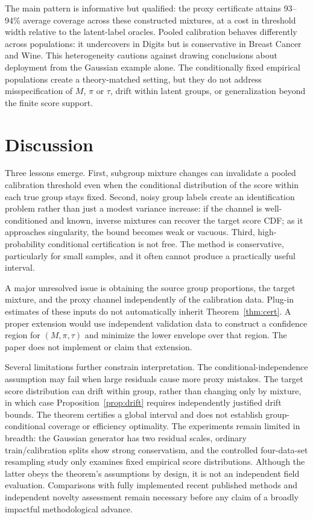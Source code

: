 \documentclass[twoside,11pt]{article}
\begin{document}
The main pattern is informative but qualified: the proxy certificate attains 93--94\% average coverage across these constructed mixtures, at a cost in threshold width relative to the latent-label oracles. Pooled calibration behaves differently across populations: it undercovers in Digits but is conservative in Breast Cancer and Wine. This heterogeneity cautions against drawing conclusions about deployment from the Gaussian example alone. The conditionally fixed empirical populations create a theory-matched setting, but they do not address misspecification of $M$, $\pi$ or $\tau$, drift within latent groups, or generalization beyond the finite score support.

\section{Discussion}
Three lessons emerge. First, subgroup mixture changes can invalidate a pooled calibration threshold even when the conditional distribution of the score within each true group stays fixed. Second, noisy group labels create an identification problem rather than just a modest variance increase: if the channel is well-conditioned and known, inverse mixtures can recover the target score CDF; as it approaches singularity, the bound becomes weak or vacuous. Third, high-probability conditional certification is not free. The method is conservative, particularly for small samples, and it often cannot produce a practically useful interval.

A major unresolved issue is obtaining the source group proportions, the target mixture, and the proxy channel independently of the calibration data. Plug-in estimates of these inputs do not automatically inherit Theorem~\ref{thm:cert}. A proper extension would use independent validation data to construct a confidence region for $(M,\pi,\tau)$ and minimize the lower envelope over that region. The paper does not implement or claim that extension.

Several limitations further constrain interpretation. The conditional-independence assumption may fail when large residuals cause more proxy mistakes. The target score distribution can drift within group, rather than changing only by mixture, in which case Proposition~\ref{prop:drift} requires independently justified drift bounds. The theorem certifies a global interval and does not establish group-conditional coverage or efficiency optimality. The experiments remain limited in breadth: the Gaussian generator has two residual scales, ordinary train/calibration splits show strong conservatism, and the controlled four-data-set resampling study only examines fixed empirical score distributions. Although the latter obeys the theorem's assumptions by design, it is not an independent field evaluation. Comparisons with fully implemented recent published methods and independent novelty assessment remain necessary before any claim of a broadly impactful methodological advance.
\end{document}
